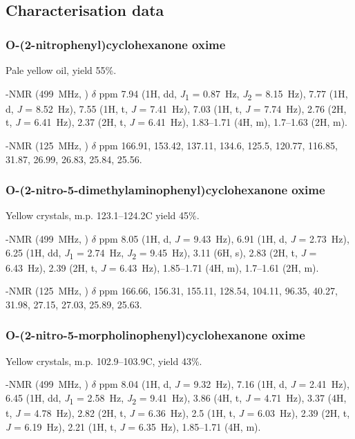 \begin{refsection}
\subsection{Characterisation data}

\subsubsection{O-(2-nitrophenyl)cyclohexanone oxime }

Pale yellow oil, yield 55\%.

-NMR (499~MHz, ) $\delta$ ppm 7.94 (1H, dd, \textit{J}\textsubscript{1} = 0.87~Hz, \textit{J}\textsubscript{2} = 8.15~Hz), 7.77 (1H, d, \textit{J} = 8.52~Hz), 7.55 (1H, t, \textit{J} = 7.41~Hz), 7.03 (1H, t, \textit{J} = 7.74~Hz), 2.76 (2H, t, \textit{J} = 6.41~Hz), 2.37 (2H, t, \textit{J} = 6.41~Hz), 1.83--1.71 (4H, m), 1.7--1.63 (2H, m).

-NMR (125~MHz, ) $\delta$ ppm 166.91, 153.42, 137.11, 134.6, 125.5, 120.77, 116.85, 31.87, 26.99, 26.83, 25.84, 25.56.

\subsubsection{O-(2-nitro-5-dimethylaminophenyl)cyclohexanone oxime }

Yellow crystals, m.p. 123.1--124.2\degree{}C yield 45\%.

-NMR (499~MHz, ) $\delta$ ppm 8.05 (1H, d, \textit{J} = 9.43~Hz), 6.91 (1H, d, \textit{J} = 2.73~Hz), 6.25 (1H, dd, \textit{J}\textsubscript{1} = 2.74~Hz, \textit{J}\textsubscript{2} = 9.45~Hz), 3.11 (6H, s), 2.83 (2H, t, \textit{J} = 6.43~Hz), 2.39 (2H, t, \textit{J} = 6.43~Hz), 1.85--1.71 (4H, m), 1.7--1.61 (2H, m).

-NMR (125~MHz, ) $\delta$ ppm 166.66, 156.31, 155.11, 128.54, 104.11, 96.35, 40.27, 31.98, 27.15, 27.03, 25.89, 25.63.

\subsubsection{O-(2-nitro-5-morpholinophenyl)cyclohexanone oxime }

Yellow crystals, m.p. 102.9--103.9\degree{}C, yield 43\%.

-NMR (499~MHz, ) $\delta$ ppm 8.04 (1H, d, \textit{J} = 9.32~Hz), 7.16 (1H, d, \textit{J} = 2.41~Hz), 6.45 (1H, dd, \textit{J}\textsubscript{1} = 2.58~Hz, \textit{J}\textsubscript{2} = 9.41~Hz), 3.86 (4H, t, \textit{J} = 4.71~Hz), 3.37 (4H, t, \textit{J} = 4.78~Hz), 2.82 (2H, t, \textit{J} = 6.36~Hz), 2.5 (1H, t, \textit{J} = 6.03~Hz), 2.39 (2H, t, \textit{J} = 6.19~Hz), 2.21 (1H, t, \textit{J} = 6.35~Hz), 1.85--1.71 (4H, m).


\end{refsection}
